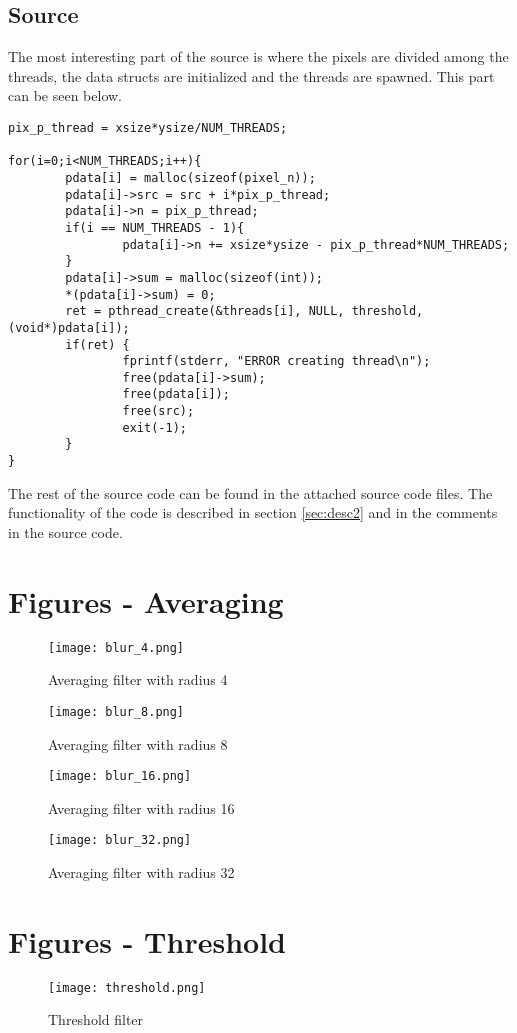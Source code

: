 \documentclass[a4paper, 12pt]{article}
\begin{document}
\subsection{Source}

The most interesting part of the source is where the pixels are divided among
the threads, the data structs are initialized and the threads are spawned. 
This part can be seen below.
\begin{lstlisting}
pix_p_thread = xsize*ysize/NUM_THREADS;

for(i=0;i<NUM_THREADS;i++){
        pdata[i] = malloc(sizeof(pixel_n));
        pdata[i]->src = src + i*pix_p_thread;
        pdata[i]->n = pix_p_thread;
        if(i == NUM_THREADS - 1){
                pdata[i]->n += xsize*ysize - pix_p_thread*NUM_THREADS;
        }
        pdata[i]->sum = malloc(sizeof(int));
        *(pdata[i]->sum) = 0;
        ret = pthread_create(&threads[i], NULL, threshold, (void*)pdata[i]);
        if(ret) {
                fprintf(stderr, "ERROR creating thread\n");
                free(pdata[i]->sum);
                free(pdata[i]);
                free(src);
                exit(-1);
        }
}
\end{lstlisting}

The rest of the source code can be found in the attached source code files.
The functionality of the code is described in section \ref{sec:desc2} and in the
comments in the source code.

\newpage
\appendix
\section{Figures - Averaging}
\label{sec:fig_aver}

\begin{figure}[hb]
        \centering
        \texttt{[image: blur\_4.png]}
        \caption{Averaging filter with radius 4}
        \label{fig:blur_4}
\end{figure}
\begin{figure}[hb]
        \centering
        \texttt{[image: blur\_8.png]}
        \caption{Averaging filter with radius 8}
        \label{fig:blur_8}
\end{figure}
\begin{figure}[hb]
        \centering
        \texttt{[image: blur\_16.png]}
        \caption{Averaging filter with radius 16}
        \label{fig:blur_16}
\end{figure}
\begin{figure}[hb]
        \centering
        \texttt{[image: blur\_32.png]}
        \caption{Averaging filter with radius 32}
        \label{fig:blur_32}
\end{figure}
\clearpage
\section{Figures - Threshold}
\label{sec:fig_thres}

\begin{figure}[h]
        \centering
        \texttt{[image: threshold.png]}
        \caption{Threshold filter}
        \label{fig:thres}
\end{figure}
\end{document}
